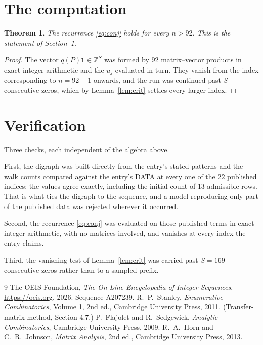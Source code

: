 \documentclass[11pt,a4paper]{article}
\theoremstyle{plain}
\newtheorem{theorem}{Theorem}
\theoremstyle{definition}
\begin{document}
\section{The computation}

\begin{theorem}
The recurrence \eqref{eq:conj} holds for every $n>92$. This is the statement of
Section~1.
\end{theorem}

\begin{proof}
The vector $q(P)\mathbf{1}\in\mathbb{Z}^{S}$ was formed by $92$ matrix--vector
products in exact integer arithmetic and the $u_j$ evaluated in turn. They vanish from the
index corresponding to $n=92+1$ onwards, and the run was continued past $S$ consecutive
zeros, which by Lemma~\ref{lem:crit} settles every larger index.
\end{proof}

\section{Verification}

Three checks, each independent of the algebra above.

First, the digraph was built directly from the entry's stated patterns and the walk counts
compared against the entry's DATA at every one of the $22$ published indices; the
values agree exactly, including the initial count of $13$ admissible rows. That is
what ties the digraph to the sequence, and a model reproducing only part of the published
data was rejected wherever it occurred.

Second, the recurrence \eqref{eq:conj} was evaluated on those published terms in exact
integer arithmetic, with no matrices involved, and vanishes at every index the entry claims.

Third, the vanishing test of Lemma~\ref{lem:crit} was carried past $S=169$ consecutive
zeros rather than to a sampled prefix.

\begin{thebibliography}{9}
 The OEIS Foundation, \emph{The On-Line Encyclopedia of Integer
Sequences}, \url{https://oeis.org}, 2026. Sequence A207239.
 R.~P.~Stanley, \emph{Enumerative Combinatorics}, Volume 1, 2nd ed.,
Cambridge University Press, 2011. (Transfer-matrix method, Section 4.7.)
 P.~Flajolet and R.~Sedgewick, \emph{Analytic Combinatorics}, Cambridge
University Press, 2009.
 R.~A.~Horn and C.~R.~Johnson, \emph{Matrix Analysis}, 2nd ed., Cambridge
University Press, 2013.
\end{thebibliography}
\end{document}
